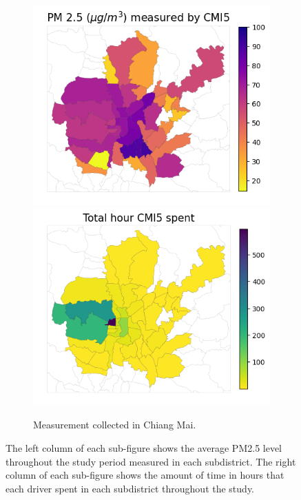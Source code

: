 \begin{figure}
\begin{subfigure}[t]{0.49\textwidth}
        \includegraphics[width=.49\linewidth]{figures/map/CMI5_PM25.png}%
        \includegraphics[width=.49\linewidth]{figures/map/CMI5_time.png}
        \caption{Measurement collected in Chiang Mai.}
    \end{subfigure}%
    \caption{
    The left column of each sub-figure shows the average PM2.5 level throughout the study period measured in each subdistrict.
    The right column of each sub-figure shows the amount of time in hours that each driver spent in each subdistrict throughout the study.
    }%
    \Description{}
    \label{fig:subdistrict-aqi}%
\end{figure}%
